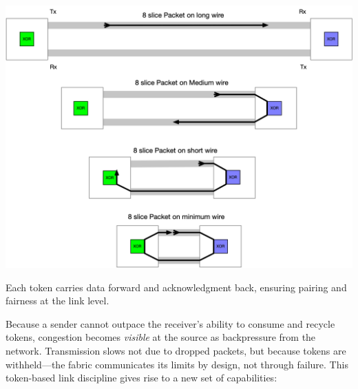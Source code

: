 \documentclass[../OAE-SPEC-MAIN.tex]{subfiles}
\begin{document}
\begin{marginfigure}
\centering
\includegraphics[width=\linewidth]{./figures/SNAKEs.png}
\caption{Each token carries data forward and acknowledgment back, ensuring pairing and fairness at the link level.}
\end{marginfigure}

Because a sender cannot outpace the receiver’s ability to consume and recycle tokens, congestion becomes \emph{visible} at the source as backpressure from the network. Transmission slows not due to dropped packets, but because tokens are withheld—the fabric communicates its limits by design, not through failure. This token-based link discipline gives rise to a new set of capabilities:
\end{document}

